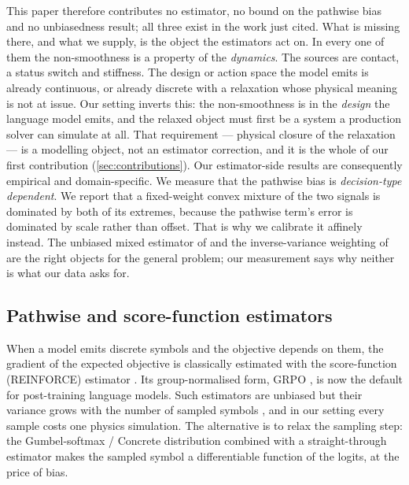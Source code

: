 This paper therefore contributes no estimator, no bound on the pathwise bias and
no unbiasedness result; all three exist in the work just cited.  What is missing
there, and what we supply, is the object the estimators act on.  In every one of
them the non-smoothness is a property of the \emph{dynamics}.  The sources are
contact, a status switch and stiffness.  The design or action space the model
emits is already continuous, or already discrete with a relaxation whose physical
meaning is not at issue.  Our setting inverts this: the non-smoothness is in the
\emph{design} the language model emits, and the relaxed object must first be a
system a production solver can simulate at all.  That requirement --- physical
closure of the relaxation --- is a modelling object, not an estimator
correction, and it is the whole of our first contribution
(\cref{sec:contributions}).  Our estimator-side results are
consequently empirical and domain-specific.  We measure that the pathwise bias is
\emph{decision-type dependent}.  We report that a fixed-weight convex
mixture of the two signals is dominated by both of its extremes, because the
pathwise term's error is dominated by scale rather than offset.  That is why we
calibrate it affinely instead.  The unbiased mixed estimator of \cite{hpo2026}
and the inverse-variance weighting of \cite{onoda2026ddcg} are the right objects
for the general problem; our measurement says why neither is what our data asks
for.

\subsection{Pathwise and score-function estimators}
\label{sec:rw-estimators}
When a model emits discrete symbols and the objective depends on them, the
gradient of the expected objective is classically estimated with the
score-function (REINFORCE) estimator \cite{williams1992reinforce}.  Its
group-normalised form, GRPO \cite{shao2024grpo}, is now the default for
post-training language models.  Such estimators are unbiased but their variance
grows with the number of sampled symbols \cite{mohamed2020mcgrad}, and in our
setting every sample costs one physics simulation.  The alternative is to relax
the sampling step: the Gumbel-softmax / Concrete distribution
\cite{jang2017gumbel,maddison2017concrete} combined with a straight-through
estimator \cite{bengio2013ste} makes the sampled symbol a differentiable
function of the logits, at the price of bias.

